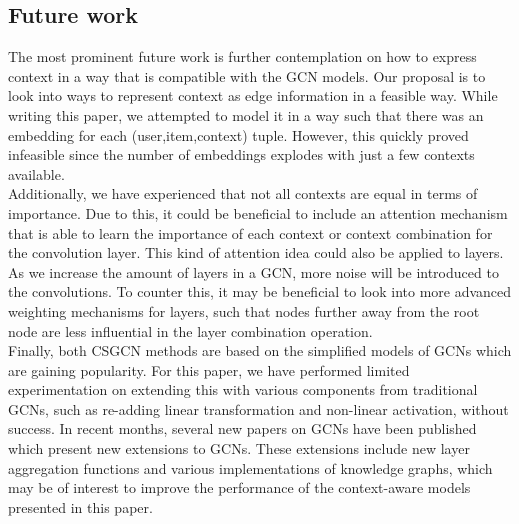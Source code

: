 
\subsection{Future work}
The most prominent future work is further contemplation on how to express context in a way that is compatible with the GCN models.
Our proposal is to look into ways to represent context as edge information in a feasible way.
While writing this paper, we attempted to model it in a way such that there was an embedding for each (user,item,context) tuple.
However, this quickly proved infeasible since the number of embeddings explodes with just a few contexts available.
\\
Additionally, we have experienced that not all contexts are equal in terms of importance.
Due to this, it could be beneficial to include an attention mechanism that is able to learn the importance of each context or context combination for the convolution layer.
This kind of attention idea could also be applied to layers.
As we increase the amount of layers in a GCN, more noise will be introduced to the convolutions.
To counter this, it may be beneficial to look into more advanced weighting mechanisms for layers, such that nodes further away from the root node are less influential in the layer combination operation.
\\
Finally, both CSGCN methods are based on the simplified models of GCNs which are gaining popularity.
For this paper, we have performed limited experimentation on extending this with various components from traditional GCNs, such as re-adding linear transformation and non-linear activation, without success.
In recent months, several new papers on GCNs have been published which present new extensions to GCNs.
These extensions include new layer aggregation functions and various implementations of knowledge graphs, which may be of interest to improve the performance of the context-aware models presented in this paper.

